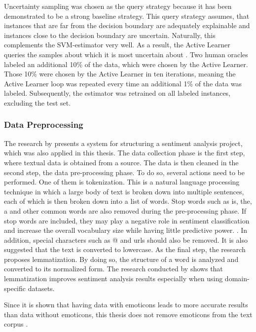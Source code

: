 \documentclass[11pt, a4paper]{article}
\begin{document}
Uncertainty sampling was chosen as the query strategy because it has been demonstrated to be a strong baseline strategy. 
This query strategy assumes, that instances that are far from the decision boundary are adequately explainable and instances close to the 
decision boundary are uncertain. Naturally, this complements the SVM-estimator very well. As a result, the Active Learner queries 
the samples about which it is most uncertain about \citep{osbonre2004ensemblebased}. Two human oracles labeled an additional 10\% of the data,
which were chosen by the Active Learner. Those 10\% were chosen by the Active Learner in ten iterations, meaning the Active Learner loop was repeated
every time an additional 1\% of the data was labeled. Subsequently, the estimator was retrained on all labeled instances, excluding the test set.

\subsubsection{Data Preprocessing}
The research by \cite{jemai2021SentimentAnalysis} presents a system for structuring a sentiment analysis project, which was also applied in this thesis.
The data collection phase is the first step, where textual data is obtained from a source. 
The data is then cleaned in the second step, the data pre-processing phase. To do so, several actions need to be performed.
One of them is tokenization. This is a natural language processing technique in which a large body of text is broken down into multiple sentences, 
each of which is then broken down into a list of words. Stop words such as is, the, a and other common words are also removed during the 
pre-processing phase. If stop words are included, they may play a negative role in sentiment classification and increase the overall 
vocabulary size while having little predictive power. \citep{zhao2017comparisontextprocess}.
In addition, special characters such as @ and urls should also be removed. 
It is also suggested that the text is converted to lowercase. As the final step, the research proposes lemmatization. By doing so,
the structure of a word is analyzed and converted to its normalized form. The research conducted by \cite{camachocollados2018role} 
shows that lemmatization improves sentiment analysis results especially when using domain-specific datasets.

Since it is shown that having data with emoticons leads to more accurate results than data without emoticons,
this thesis does not remove emoticons from the text corpus \citep{parveen2016sentimentanalysistwitter}.
\end{document}
